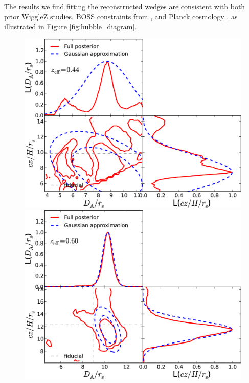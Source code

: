 \documentclass[a4paper,fleqn,usenatbib]{mnras}
\begin{document}
The results we find fitting the reconstructed wedges are consistent
with both prior WiggleZ studies, BOSS constraints from \citet{AndersonAubourg2014}, and
Planck cosmology \citep{Planck2015Parameters}, as illustrated in Figure \ref{fig:hubble_diagram}.






\begin{figure}
\begin{center}
\includegraphics[width=0.9\columnwidth]{stacked_L2D_rpt_wedges_postRec_T015_WiggleZ_z0pt2_0pt6.png}
\includegraphics[width=0.9\columnwidth]{stacked_L2D_rpt_wedges_postRec_T015_WiggleZ_z0pt4_0pt8.png}

\end{center}
\end{figure}
\end{document}
